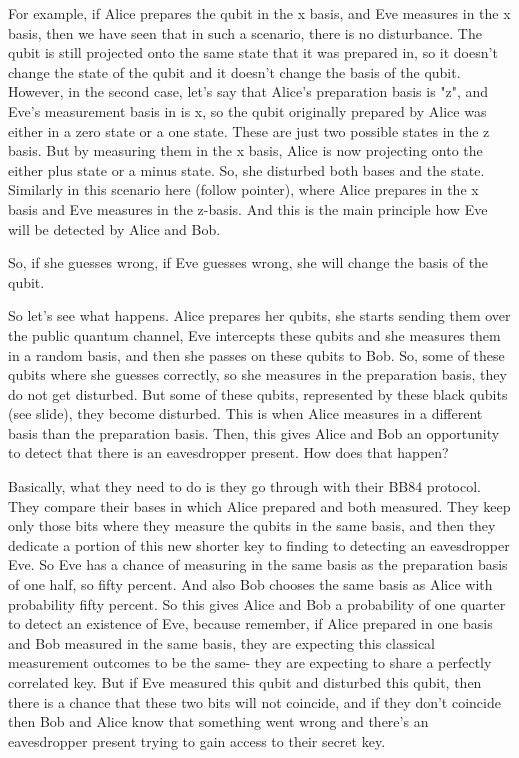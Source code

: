 For example, if Alice prepares the qubit in the x basis, and Eve measures in the x basis, then we have seen that in such a scenario, there is no disturbance. The qubit is still projected onto the same state that it was prepared in, so it doesn't change the state of the qubit and it doesn't change the basis of the qubit. However, in the second case, let's say that Alice's preparation basis is "z", and Eve's measurement basis in is x, so the qubit originally prepared by Alice was either in a zero state or a one state. These are just two possible states in the z basis. But by measuring them in the x basis, Alice is now projecting onto the either plus state or a minus state. So, she disturbed both bases and the state. Similarly in this scenario here (follow pointer), where Alice prepares in the x basis and Eve measures in the z-basis. And this is the main principle how Eve will be detected by Alice and Bob.

So, if she guesses wrong, if Eve guesses wrong, she will change the basis of the qubit.

So let's see what happens. Alice prepares her qubits, she starts sending them over the public quantum channel, Eve intercepts these qubits and she measures them in a random basis, and then she passes on these qubits to Bob. So, some of these qubits where she guesses correctly, so she measures in the preparation basis, they do not get disturbed. But some of these qubits, represented by these black qubits (see slide), they become disturbed. This is when Alice measures in a different basis than the preparation basis. Then, this gives Alice and Bob an opportunity to detect that there is an eavesdropper present. How does that happen?

Basically, what they need to do is they go through with their BB84 protocol. They compare their bases in which Alice prepared and both measured. They keep only those bits where they measure the qubits in the same basis, and then they dedicate a portion of this new shorter key to finding to detecting an eavesdropper Eve. So Eve has a chance of measuring in the same basis as the preparation basis of one half, so fifty percent. And also Bob chooses the same basis as Alice with probability fifty percent. So this gives Alice and Bob a probability of one quarter to detect an existence of Eve, because remember, if Alice prepared in one basis and Bob measured in the same basis, they are expecting this classical measurement outcomes to be the same- they are expecting to share a perfectly correlated key. But if Eve measured this qubit and disturbed this qubit, then there is a chance that these two bits will not coincide, and if they don't coincide then Bob and Alice know that something went wrong and there's an eavesdropper present trying to gain access to their secret key.

